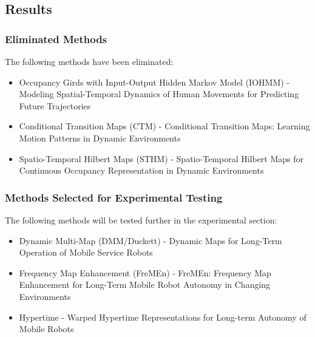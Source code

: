   \subsection{ Results }
  \subsubsection{ Eliminated Methods }
  The following methods have been eliminated:
  \begin{itemize}
    \item Occupancy Girds with Input-Output Hidden Markov Model (IOHMM) - Modeling Spatial-Temporal Dynamics of Human Movements for Predicting Future Trajectories \cite{wang2015}
    \item Conditional Transition Maps (CTM) - Conditional Transition Maps: Learning Motion Patterns in Dynamic Environments \cite{Kucner2013}
    \item Spatio-Temporal Hilbert Maps (STHM) - Spatio-Temporal Hilbert Maps for Continuous Occupancy Representation in Dynamic Environments \cite{Senanayake2016}
  \end{itemize}

  \subsubsection{ Methods Selected for Experimental Testing }
  The following methods will be tested further in the experimental section:
  \begin{itemize}
    \item Dynamic Multi-Map (DMM/Duckett) - Dynamic Maps for Long-Term Operation of Mobile Service Robots \cite{biber2005}
    \item Frequency Map Enhancement (FreMEn) - FreMEn: Frequency Map Enhancement for Long-Term Mobile Robot Autonomy in Changing Environments \cite{Krajnik2015}
    \item Hypertime - Warped Hypertime Representations for Long-term Autonomy of Mobile Robots \cite{kranjik2018}
  \end{itemize}


